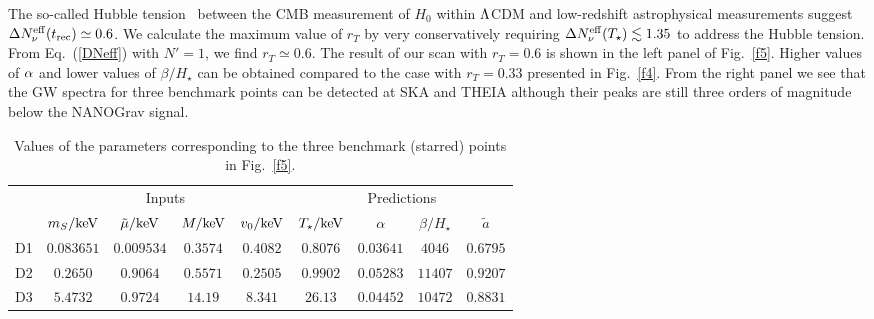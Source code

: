 \documentclass[a4paper,11pt]{article}
\begin{document}
The so-called Hubble tension~\cite{Bernal:2016gxb}
between the CMB measurement of $H_0$ within $\Lambda$CDM and low-redshift astrophysical measurements suggest  $\Delta N_\nu^{\rm eff}(t_{\rm rec}) \simeq 0.6$. %
We calculate the maximum value of $r_T$ by very conservatively requiring $\Delta N_\nu^{\rm eff}(T_\star) \lesssim 1.35$ to address the Hubble tension. From Eq.~(\ref{DNeff}) with $N'=1$, we find
 $r_T \simeq 0.6$. The result of our scan  with $r_T = 0.6$ is shown in the left panel of Fig.~\ref{f5}. Higher values of $\alpha$ and lower values
 of $\beta/H_{\star}$ can be obtained compared to the case with $r_T =0.33$ presented in Fig.~\ref{f4}. 
 From the right panel we see that the GW spectra for three benchmark
 points can be detected at SKA and THEIA although their peaks are still three orders of magnitude below
 the NANOGrav signal.
 \begin{table}[t]
\begin{center}
\begin{tabular}{ l | cccc | cccc }
 \hline\hline
& \multicolumn{4}{c|}{Inputs} & \multicolumn{4}{c}{Predictions} \\
 \cline{2-9}
 &  $m_S/{\rm keV}$ & $\tilde{\mu}/{\rm keV}$ & $M/{\rm keV}$ & $v_0/{\rm keV}$ & $T_\star/{\rm keV}$ & $\alpha$ & $\beta / H_\star$ & $\widetilde{a}$  \\\hline\hline
D1 & $0.083651$ & $0.009534$ & $0.3574$ & $0.4082$ & $0.8076$ & $0.03641$ & $4046$ & $0.6795$ \\
D2 & $0.2650$ & $0.9064$ & $0.5571$ & $0.2505$ & $0.9902$ & $0.05283$ & $11407$ & $0.9207$ \\
D3 & $5.4732$ & $0.9724$ & $14.19$ & $8.341$ & $26.13$ & $0.04452$ & $10472$ & $0.8831$ \\
 \hline\hline
\end{tabular}
\end{center}
\caption{Values of the parameters corresponding to the three benchmark (starred) points in Fig.~\ref{f5}.}
\label{tab:samples_lowT2}
\end{table}
\end{document}
